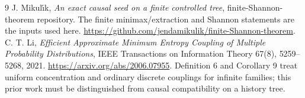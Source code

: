 \documentclass[11pt]{article}
\begin{document}
\begin{thebibliography}{9}
 J. Mikul\'{\i}k, \emph{An exact causal seed on a finite
controlled tree}, finite-Shannon-theorem repository. The finite
minimax/extraction and Shannon statements are the inputs used here.
\url{https://github.com/jendamikulik/finite-Shannon-theorem}.
 C. T. Li, \emph{Efficient Approximate Minimum Entropy
Coupling of Multiple Probability Distributions}, IEEE Transactions on
Information Theory 67(8), 5259--5268, 2021.
\url{https://arxiv.org/abs/2006.07955}.
Definition 6 and Corollary 9 treat uniform concentration and ordinary
discrete couplings for infinite families; this prior work must be
distinguished from causal compatibility on a history tree.
\end{thebibliography}
\end{document}
